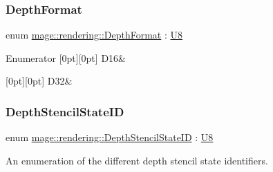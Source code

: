 \subsubsection{\texorpdfstring{Depth\+Format}{DepthFormat}}
{\footnotesize\ttfamily enum \mbox{\hyperlink{namespacemage_1_1rendering_ad477e1afff480649a92fb2253c65bfb0}{mage\+::rendering\+::\+Depth\+Format}} \+: \mbox{\hyperlink{namespacemage_a30677c03d683c4c35630c25f6ff3fb7f}{U8}}\hspace{0.3cm}{\ttfamily [strong]}}

\begin{DoxyEnumFields}{Enumerator}
[0pt][0pt]{}\mbox{\label{namespacemage_1_1rendering_ad477e1afff480649a92fb2253c65bfb0a6fd9ec81643ee5a57f85a71951bfe13d}} 
D16&\\
\hline

[0pt][0pt]{}\mbox{\label{namespacemage_1_1rendering_ad477e1afff480649a92fb2253c65bfb0aa6b2eecc4252564f599b9a979e4e0602}} 
D32&\\
\hline

\end{DoxyEnumFields}
\mbox{\label{namespacemage_1_1rendering_ace195e7a068336e477080fce30f1329e}} 
\subsubsection{\texorpdfstring{Depth\+Stencil\+State\+ID}{DepthStencilStateID}}
{\footnotesize\ttfamily enum \mbox{\hyperlink{namespacemage_1_1rendering_ace195e7a068336e477080fce30f1329e}{mage\+::rendering\+::\+Depth\+Stencil\+State\+ID}} \+: \mbox{\hyperlink{namespacemage_a30677c03d683c4c35630c25f6ff3fb7f}{U8}}\hspace{0.3cm}{\ttfamily [strong]}}

An enumeration of the different depth stencil state identifiers.

